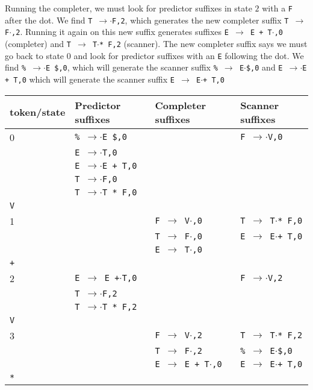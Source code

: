 \documentclass[11pt]{article}
\def\ra{\rightarrow}
\begin{document}
Running the completer, we must look for predictor suffixes in state $2$
with a \texttt{F} after the dot.  We find \texttt{T $\ra$$\cdot$F,2},
which generates the new completer suffix \texttt{T $\ra$ F$\cdot$,2}.
Running it again on this new suffix generates suffixes \texttt{E $\ra$
E + T$\cdot$,0} (completer) and \texttt{T $\ra$ T$\cdot$* F,2}
(scanner).  The new completer suffix says we must go back to state $0$
and look for predictor suffixes with an \texttt{E} following the dot.
We find \texttt{\% $\ra$$\cdot$E \$,0}, which will generate the
scanner suffix \texttt{\% $\ra$ E$\cdot$\$,0} and \texttt{E
  $\ra$$\cdot$E + T,0} which will generate the scanner suffix 
\texttt{E $\ra$ E$\cdot$+ T,0}

\begin{tabular}{|l|l|l|l|}
\hline
token/state & Predictor suffixes & Completer suffixes & Scanner suffixes\\
\hline
0     & \texttt{\% $\ra$$\cdot$E \$,0} & & \texttt{F $\ra$$\cdot$V,0}\\
      & \texttt{E $\ra$$\cdot$T,0} & & \\
      & \texttt{E $\ra$$\cdot$E + T,0} & & \\
      & \texttt{T $\ra$$\cdot$F,0} & & \\
      & \texttt{T $\ra$$\cdot$T * F,0} & & \\
\hline
\texttt{V} &  & &\\
\hline
1     &  & \texttt{F $\ra$ V$\cdot$,0}& \texttt{T $\ra$ T$\cdot$* F,0} \\
      &  & \texttt{T $\ra$ F$\cdot$,0}& \texttt{E $\ra$ E$\cdot$+ T,0} \\
      &  & \texttt{E $\ra$ T$\cdot$,0}& \\
\hline
\texttt{+} &  & &\\
\hline
2     & \texttt{E $\ra$ E +$\cdot$T,0} & & \texttt{F $\ra$$\cdot$V,2}\\
      & \texttt{T $\ra$$\cdot$F,2} & & \\
      & \texttt{T $\ra$$\cdot$T * F,2} & & \\
\hline 
\texttt{V} & & &\\
\hline
3     &  &  \texttt{F $\ra$ V$\cdot$,2}& \texttt{T $\ra$ T$\cdot$* F,2}\\
      &  &  \texttt{T $\ra$ F$\cdot$,2}& \texttt{\% $\ra$ E$\cdot$\$,0}\\
      &  &  \texttt{E $\ra$ E + T$\cdot$,0}& \texttt{E $\ra$ E$\cdot$+ T,0}\\
\hline
\texttt{*} & & & \\
\hline
\end{tabular}
\end{document}
